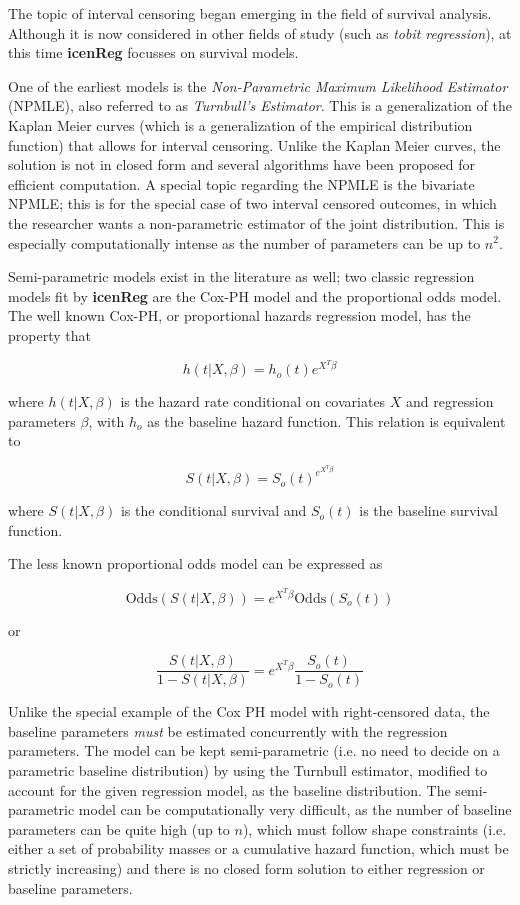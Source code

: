 \documentclass[11pt]{report}
\begin{document}
  The topic of interval censoring began emerging in the field of survival analysis. 
  Although it is now considered in other fields of study (such as \emph{tobit regression}),
  at this time {\bf{icenReg}} focusses on survival models. 
  
  
  One of the earliest models is the \emph{Non-Parametric Maximum Likelihood Estimator} 
  (NPMLE), also referred to as \emph{Turnbull's Estimator}. This is a generalization of
  the Kaplan Meier curves (which is a generalization of the empirical distribution function)
  that allows for interval censoring. Unlike the Kaplan Meier curves, the solution is not
  in closed form and several algorithms have been proposed for efficient computation. 
  A special topic regarding the NPMLE is the bivariate NPMLE; this is for the special 
  case of two interval censored outcomes, in which the researcher wants a non-parametric 
  estimator of the joint distribution. This is especially computationally intense as the
  number of parameters can be up to $n^2$. 
  
  Semi-parametric models exist in the literature as well; two classic regression models
  fit by {\bf icenReg} are the Cox-PH model and the proportional odds model. 
  The well known Cox-PH, or proportional hazards regression model, has the property that
  
  \[ h(t | X, \beta) = h_o(t) e^{X^T \beta} \]
  
  where $h(t | X, \beta)$ is the hazard rate conditional on covariates $X$ and regression parameters $\beta$,
  with $h_o$ as the baseline hazard function. This relation is equivalent to 

  \[S(t | X, \beta) = S_o(t)^{e^{X^T \beta} } \]
  
  where $S(t| X, \beta)$ is the conditional survival and $S_o(t)$ is the baseline survival function. 
  
  The less known proportional odds model can be expressed as
  
  \[\text{Odds}(S(t | X, \beta)) = e^{X^T \beta} \text{Odds}(S_o(t)) \]
  \begin{center}  
  or
  \end{center}
  \[ \frac{S(t | X, \beta)} {1 - S(t | X, \beta) } = e^{X^T \beta}\frac{S_o(t)} {1 - S_o(t)} \]
  
  
  Unlike the special example
  of the Cox PH model with right-censored data, the baseline parameters 
  \emph{must} be estimated concurrently
  with the regression parameters. The model can be kept semi-parametric (i.e. no need to 
  decide on a parametric baseline distribution) by using the Turnbull estimator, modified
  to account for the given regression model, as the baseline distribution. 
  The semi-parametric model can be computationally very difficult,
  as the number of baseline parameters can be quite high (up to $n$), which must follow
  shape constraints (i.e. either a set of probability masses or a cumulative hazard function,
  which must be strictly increasing) and there is no closed form solution to either
  regression or baseline parameters.
  
\end{document}
